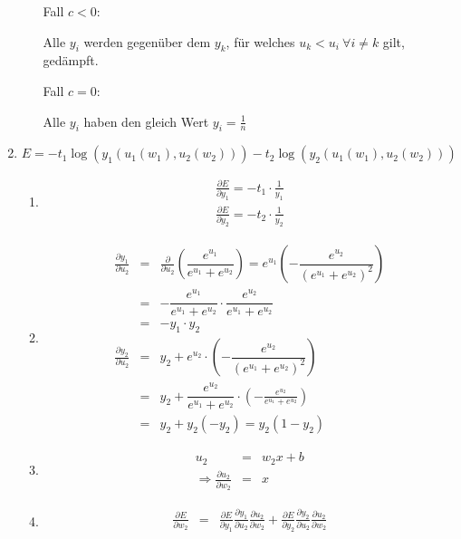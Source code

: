 \documentclass[DIN, pagenumber=false, fontsize=11pt, parskip=half]{scrartcl}
\begin{document}
\begin{enumerate}
\begin{enumerate}[label=(\alph*)]
					Fall $c < 0$:

					Alle $y_i$ werden gegenüber dem $y_k$, für welches $u_k < u_i \ \forall i\neq k$ gilt, gedämpft.

					Fall $c = 0$:

					Alle $y_i$ haben den gleich Wert $y_i = \frac{1}{n}$
			\end{enumerate}
		\item
			\begin{equation*}
					E = -t_1 \log(y_1(u_1(w_1), u_2(w_2))) -t_2 \log(y_2(u_1(w_1), u_2(w_2)))
			\end{equation*}
			\begin{enumerate}[label=(\alph*)]
				\item
					\begin{eqnarray*}
							\frac{\partial E}{\partial y_1} = -t_1 \cdot \frac{1}{y_1} \\
							\frac{\partial E}{\partial y_2} = -t_2 \cdot \frac{1}{y_2}
					\end{eqnarray*}
				\item
					\begin{eqnarray*}
							\frac{\partial y_1}{\partial u_2} &=& \frac{\partial}{\partial u_2}\left( \dfrac{e^{u_1}}{e^{u_1} + e^{u_2}} \right) = 
							e^{u_1}\left( -\dfrac{e^{u_2}}{(e^{u_1} + e^{u_2})^2} \right) \\
							&=&-\dfrac{e^{u_1}}{e^{u_1} + e^{u_2}} \cdot \dfrac{e^{u_2}}{e^{u_1} + e^{u_2}} \\
							&=& -y_1 \cdot y_2 \\
							\frac{\partial y_2}{\partial u_2} &=& y_2 + e^{u_2} \cdot \left( -\dfrac{e^{u_2}}{(e^{u_1} + e^{u_2})^2}  \right) \\
							&=& y_2 + \dfrac{e^{u_2}}{e^{u_1} + e^{u_2}} \cdot \left( -\frac{e^{u_2}}{e^{u_1} + e^{u_2}}  \right) \\
							&=& y_2 + y_2(-y_2) = y_2 (1-y_2)
					\end{eqnarray*}
				\item
					\begin{eqnarray*}
							u_2 &=& w_2 x + b \\
							\Rightarrow \frac{\partial u_2}{\partial w_2} &=& x
					\end{eqnarray*}
				\item
					\begin{eqnarray*}
							\frac{\partial E}{\partial w_2} &=& \frac{\partial E}{\partial y_1} \frac{\partial y_1}{\partial u_2} \frac{\partial u_2}{\partial w_2} + 
							\frac{\partial E}{\partial y_2} \frac{\partial y_2}{\partial u_2} \frac{\partial u_2}{\partial w_2}  \\

\end{eqnarray*}
\end{enumerate}
\end{enumerate}
\end{document}
